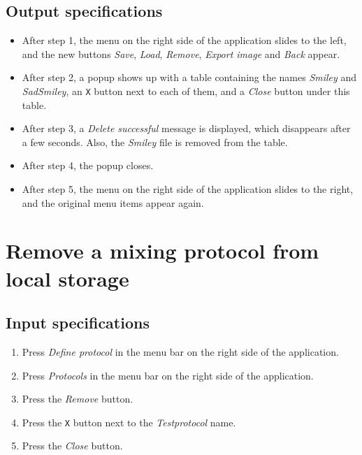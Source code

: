 \subsection*{Output specifications}
\begin{itemize}
\item After step 1, the menu on the right side of the application slides to the left, and the new buttons \emph{Save}, \emph{Load}, \emph{Remove}, \emph{Export image} and \emph{Back} appear.
\item After step 2, a popup shows up with a table containing the names \emph{Smiley} and \emph{SadSmiley}, an \texttt{X} button next to each of them, and a \emph{Close} button under this table.
\item After step 3, a \emph{Delete successful} message is displayed, which disappears after a few seconds. Also, the \emph{Smiley} file is removed from the table.
\item After step 4, the popup closes.
\item After step 5, the menu on the right side of the application slides to the right, and the original menu items appear again.
\end{itemize}

\section{Remove a mixing protocol from local storage}

\subsection*{Input specifications}
\begin{enumerate}
\item Press \emph{Define protocol} in the menu bar on the right side of the application.
\item Press \emph{Protocols} in the menu bar on the right side of the application.
\item Press the \emph{Remove} button.
\item Press the \texttt{X} button next to the \emph{Testprotocol} name.
\item Press the \emph{Close} button.
\end{enumerate}

